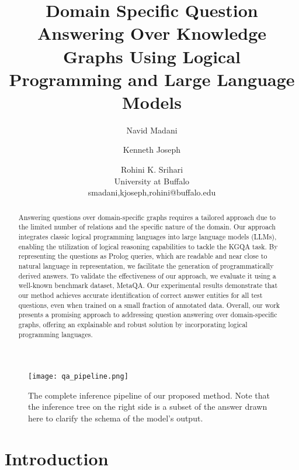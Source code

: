 \documentclass[11pt]{article}
\title{Domain Specific Question Answering Over Knowledge Graphs Using Logical Programming and Large Language Models}
\author{Navid Madani \and Kenneth Joseph \and Rohini K. Srihari  \\
        University at Buffalo \\ smadani,kjoseph,rohini@buffalo.edu}
\begin{document}
\maketitle
\begin{abstract}

Answering questions over domain-specific graphs requires a tailored approach due to the limited number of relations and the specific nature of the domain. Our approach integrates classic logical programming languages into large language models (LLMs), enabling the utilization of logical reasoning capabilities to tackle the KGQA task. By representing the questions as Prolog queries, which are readable and near close to natural language in representation, we facilitate the generation of programmatically derived answers. To validate the effectiveness of our approach, we evaluate it using a well-known benchmark dataset, MetaQA. Our experimental results demonstrate that our method achieves accurate identification of correct answer entities for all test questions, even when trained on a small fraction of annotated data. Overall, our work presents a promising approach to addressing question answering over domain-specific graphs, offering an explainable and robust solution by incorporating logical programming languages.
\end{abstract}

\begin{figure*}
  \centering
  \texttt{[image: qa\_pipeline.png]}
  \caption{The complete inference pipeline of our proposed method. Note that the inference tree on the right side is a subset of the answer drawn here to clarify the schema of the model's output.}
  \label{fig:qa_pip}
\end{figure*}

\section{Introduction}
\end{document}
